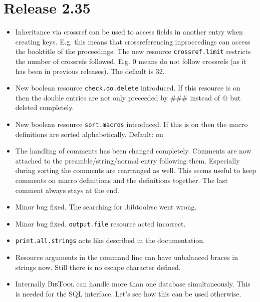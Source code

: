 \documentclass[11pt,a4paper]{scrartcl}
\newcommand\rsc[1]{\texttt{#1}}
\newcommand\File[1]{\textsf{#1}}
\newcommand\BibTool{\textsc{BibTool}}
\newenvironment{Release}[2]{\section*{Release #1}\begin{itemize}}{\end{itemize}}
\newenvironment{Fix}[1]{\item }{}
\newenvironment{New}[1]{\item }{}
\newenvironment{Update}[1]{\item }{}
\begin{document}
 \begin{Release}{2.35}{}
  \begin{Update}{gene}
    Inheritance via crossref can be used to access fields in another
    entry when creating keys. E.g. this means that crossreferencing
    inproceedings can access the booktitle of the proceedings. The new
    resource \rsc{crossref.limit} restricts the number of crossrefs
    followed. E.g. 0 means do not follow crossrefs (as it has been in
    previous releases). The default is 32.
  \end{Update}
  \begin{New}{gene}
    New boolean resource \rsc{check.do.delete} introduced. If this
    resource is on then the double entries are not only preceeded by
    \#\#\# instead of @ but deleted completely.
  \end{New}
  \begin{New}{gene}
    New boolean resource \rsc{sort.macros} introduced. If this is on
    then the macro definitions are sorted alphabetically. Default: on
  \end{New}
  \begin{Update}{gene}
    The handling of comments has been changed completely. Comments are
    now attached to the preamble/string/normal entry following them.
    Especially during sorting the comments are rearranged as well.
    This seems useful to keep comments on macro definitions and the
    definitions together. The last comment always stays at the end.
  \end{Update}
  \begin{Fix}{gene}
    Minor bug fixed. The searching for \File{.bibtoolrsc} went wrong.
  \end{Fix}
  \begin{Fix}{gene}
    Minor bug fixed. \rsc{output.file} resource acted incorrect.
  \end{Fix}
  \begin{New}{gene}
    \rsc{print.all.strings} acts like described in the documentation.
  \end{New}
  \begin{Update}{gene}
    Resource arguments in the command line can have unbalanced braces in
    strings now. Still there is no escape character defined.
  \end{Update}
  \begin{Update}{gene}
    Internally \BibTool{} can handle more than one database simultaneously.
    This is needed for the SQL interface. Let's see how this can be used
    otherwise.
  \end{Update}
 \end{Release}
\end{document}
